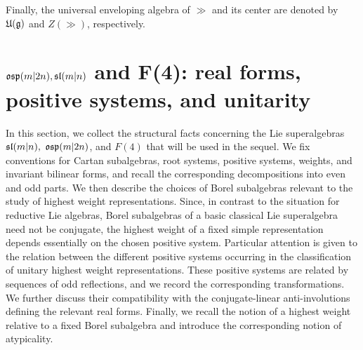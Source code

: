 Finally, the universal enveloping algebra of $\gg$ and its center are denoted by $\UE(\gg)$ and $Z(\gg)$, respectively.

\section{\texorpdfstring{$\osp(m\vert 2n), \slmn$}{} and \texorpdfstring{F(4)}{}: real forms, positive systems, and unitarity}\label{sec::preliminaries_slmn_and_osp}
\noindent
In this section, we collect the structural facts concerning the Lie superalgebras $\sl(m\vert n),$ $\osp(m\vert 2n)$, and $F(4)$ that will be used in the sequel. We fix conventions for Cartan subalgebras, root systems, positive systems, weights, and invariant bilinear forms, and recall the corresponding decompositions into even and odd parts. We then describe the choices of Borel subalgebras relevant to the study of highest weight representations. Since, in contrast to the situation for reductive Lie algebras, Borel subalgebras of a basic classical Lie superalgebra need not be conjugate, the highest weight of a fixed simple representation depends essentially on the chosen positive system. Particular attention is given to the relation between the different positive systems occurring in the classification of unitary highest weight representations. These positive systems are related by sequences of odd reflections, and we record the corresponding transformations. We further discuss their compatibility with the conjugate-linear anti-involutions defining the relevant real forms. Finally, we recall the notion of a highest weight relative to a fixed Borel subalgebra and introduce the corresponding notion of atypicality.

